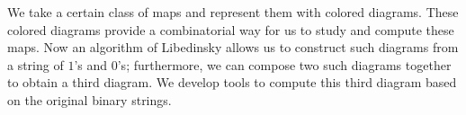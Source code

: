 
We take a certain class of maps and represent them with colored diagrams.  These colored diagrams provide a combinatorial way for us to study and compute these maps.  Now an algorithm of Libedinsky allows us to construct such diagrams from a string of $1$'s and $0$'s; furthermore, we can compose two such diagrams together to obtain a third diagram.   We develop tools to compute this third diagram based on the original binary strings.

